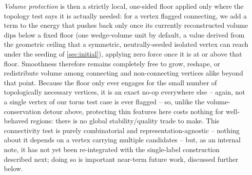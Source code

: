\documentclass[journal]{vgtc}                     %
\begin{document}
\emph{Volume protection} is then a strictly local, one-sided floor applied only where the topology test says it is actually needed: for a vertex flagged connecting, we add a term to the energy that pushes back only once its currently reconstructed volume dips below a fixed floor (one wedge-volume unit by default, a value derived from the geometric ceiling that a symmetric, neutrally-seeded isolated vertex can reach under the seeding of \cref{sec:initial}), applying zero force once it is at or above that floor. Smoothness therefore remains completely free to grow, reshape, or redistribute volume among connecting and non-connecting vertices alike beyond that point. Because the floor only ever engages for the small number of topologically necessary vertices, it is an exact no-op everywhere else -- again, not a single vertex of our torus test case is ever flagged -- so, unlike the volume-conservation detour above, protecting thin features here costs nothing for well-behaved regions: there is no global stability/quality trade to make. This connectivity test is purely combinatorial and representation-agnostic -- nothing about it depends on a vertex carrying multiple candidates -- but, as an internal note, it has not yet been re-integrated with the single-label construction described next; doing so is important near-term future work, discussed further below.
\end{document}
